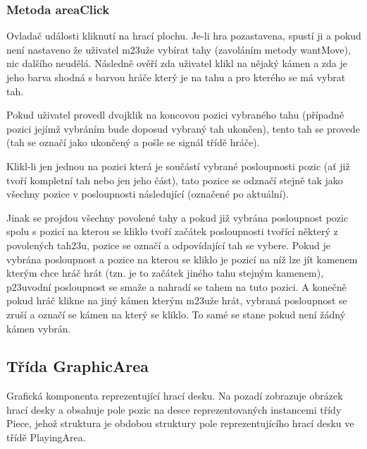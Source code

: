 \documentclass{article}
\begin{document}
\subsubsection{Metoda areaClick}
Ovlada\v{c} ud\'alosti kliknut\'i na hrac\'i plochu. Je-li hra pozastavena, spust\'i ji a pokud nen\'i nastaveno \v{z}e u\v{z}ivatel m\accent23u\v{z}e vyb\'irat tahy (zavol\'an\'im metody wantMove), nic dal\v{s}\'iho neud\v{e}l\'a. N\'asledn\v{e} ov\v{e}\v{r}\'i zda u\v{z}ivatel klikl na n\v{e}jak\'y k\'amen a zda je jeho barva shodn\'a s barvou hr\'a\v{c}e kter\'y je na tahu a pro kter\'eho se m\'a vybrat tah.\medskip

Pokud u\v{z}ivatel provedl dvojklik na koncovou pozici vybran\'eho tahu (p\v{r}\'ipadn\v{e} pozici jej\'im\v{z} vybr\'an\'im bude doposud vybran\'y tah ukon\v{c}en), tento tah se provede (tah se ozna\v{c}\'i jako ukon\v{c}en\'y a po\v{s}le se sign\'al t\v{r}\'id\v{e} hr\'a\v{c}e).\medskip

Klikl-li jen jednou na pozici kter\'a je sou\v{c}\'ast\'i vybran\'e posloupnosti pozic (a\v{t} ji\v{z} tvo\v{r}\'i kompletn\'i tah nebo jen jeho \v{c}\'ast), tato pozice se odzna\v{c}\'i stejn\v{e} tak jako v\v{s}echny pozice v posloupnosti n\'asleduj\'ic\'i (ozna\v{c}en\'e po aktu\'aln\'i).\medskip

Jinak se projdou v\v{s}echny povolen\'e tahy a pokud ji\v{z} vybr\'ana posloupnost pozic spolu s pozic\'i na kterou se kliklo tvo\v{r}\'i za\v{c}\'atek posloupnosti tvo\v{r}\'ic\'i n\v{e}kter\'y z povolen\'ych tah\accent23u, pozice se ozna\v{c}\'i a odpov\'idaj\'ic\'i tah se vybere. Pokud je vybr\'ana posloupnost a pozice na kterou se kliklo je pozic\'i na n\'i\v{z} lze j\'it kamenem kter\'ym chce hr\'a\v{c} hr\'at (tzn. je to za\v{c}\'atek jin\'eho tahu stejn\'ym kamenem), p\accent23uvodn\'i posloupnost se sma\v{z}e a nahrad\'i se tahem na tuto pozici. A kone\v{c}n\v{e} pokud hr\'a\v{c} klikne na jin\'y k\'amen kter\'ym m\accent23u\v{z}e hr\'at, vybran\'a posloupnost se zru\v{s}\'i a ozna\v{c}\'i se k\'amen na kter\'y se kliklo. To sam\'e se stane pokud nen\'i \v{z}\'adn\'y k\'amen vybr\'an.




\subsection{T\v{r}\'ida GraphicArea}
Grafick\'a komponenta reprezentuj\'ic\'i hrac\'i desku. Na pozad\'i zobrazuje obr\'azek hrac\'i desky a obsahuje pole pozic na desce reprezentovan\'ych instancemi t\v{r}\'idy Piece, jeho\v{z} struktura je obdobou struktury pole reprezentuj\'ic\'iho hrac\'i desku ve t\v{r}\'id\v{e} PlayingArea.\medskip
\end{document}

